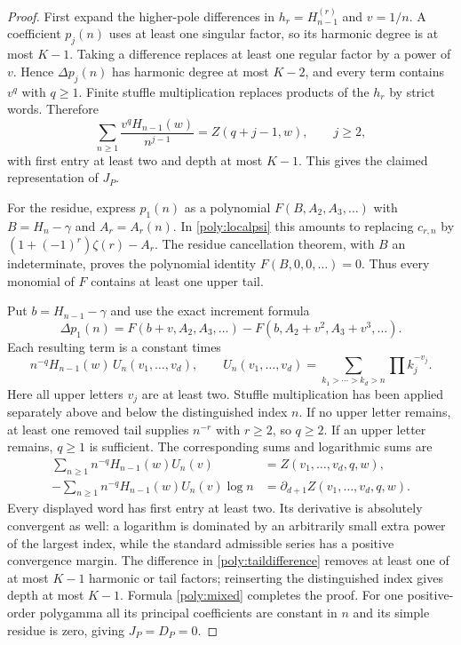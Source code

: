 \begin{proof}
First expand the higher-pole differences in
$h_r=H_{n-1}^{(r)}$ and $v=1/n$. A coefficient $p_j(n)$ uses at
least one singular factor, so its harmonic degree is at most $K-1$.
Taking a difference replaces at least one regular factor by a power
of $v$. Hence $\Delta p_j(n)$ has harmonic degree at most $K-2$,
and every term contains $v^q$ with $q\ge1$.
Finite stuffle multiplication replaces products of the $h_r$ by strict
words. Therefore
\[
 \sum_{n\ge1}\frac{v^q H_{n-1}(w)}{n^{j-1}}
 =Z(q+j-1,w),\qquad j\ge2,
\]
with first entry at least two and depth at most $K-1$.
This gives the claimed representation of $J_P$.

For the residue, express $p_1(n)$ as a polynomial
$F(B,A_2,A_3,\ldots)$ with $B=H_n-\gamma$ and
$A_r=A_r(n)$. In \eqref{poly:localpsi} this amounts to replacing
$c_{r,n}$ by $(1+(-1)^r)\zeta(r)-A_r$.
The residue cancellation theorem, with $B$ an indeterminate, proves
the polynomial identity $F(B,0,0,\ldots)=0$. Thus every monomial
of $F$ contains at least one upper tail.

Put $b=H_{n-1}-\gamma$ and use the exact increment formula
\begin{equation}\label{poly:taildifference}
 \Delta p_1(n)=F(b+v,A_2,A_3,\ldots)
       -F(b,A_2+v^2,A_3+v^3,\ldots).
\end{equation}
Each resulting term is a constant times
\begin{equation}\label{poly:splitword}
 n^{-q}H_{n-1}(w)\,U_n(v_1,\ldots,v_d),\qquad
 U_n(v_1,\ldots,v_d)=
 \sum_{k_1>\cdots>k_d>n}\prod k_j^{-v_j}.
\end{equation}
Here all upper letters $v_j$ are at least two. Stuffle multiplication
has been applied separately above and below the distinguished index $n$.
If no upper letter remains, at least one removed tail supplies
$n^{-r}$ with $r\ge2$, so $q\ge2$. If an upper letter remains,
$q\ge1$ is sufficient. The corresponding sums and logarithmic sums are
\begin{align}
 \sum_{n\ge1}n^{-q}H_{n-1}(w)U_n(v)
     &=Z(v_1,\ldots,v_d,q,w),\label{poly:concatenate}\\
 -\sum_{n\ge1}n^{-q}H_{n-1}(w)U_n(v)\log n
     &=\partial_{d+1}Z(v_1,\ldots,v_d,q,w).
 \label{poly:concatenateD}
\end{align}
Every displayed word has first entry at least two. Its derivative is
absolutely convergent as well: a logarithm is dominated by an arbitrarily
small extra power of the largest index, while the standard admissible
series has a positive convergence margin.
The difference in \eqref{poly:taildifference} removes at least one of
at most $K-1$ harmonic or tail factors; reinserting the distinguished
index gives depth at most $K-1$. Formula \eqref{poly:mixed} completes
the proof. For one positive-order polygamma all its principal coefficients
are constant in $n$ and its simple residue is zero, giving $J_P=D_P=0$.
\end{proof}


